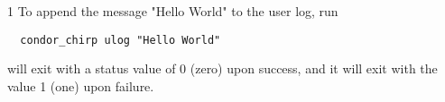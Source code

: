 \begin{ManPage}{\label{man-condor-chirp}}{1}
To append the message "Hello World" to the user log, run

\footnotesize
\begin{verbatim}
  condor_chirp ulog "Hello World"
\end{verbatim}
\normalsize

\ExitStatus

 will exit with a status value of 0 (zero) upon success,
and it will exit with the value 1 (one) upon failure.

\end{ManPage}
